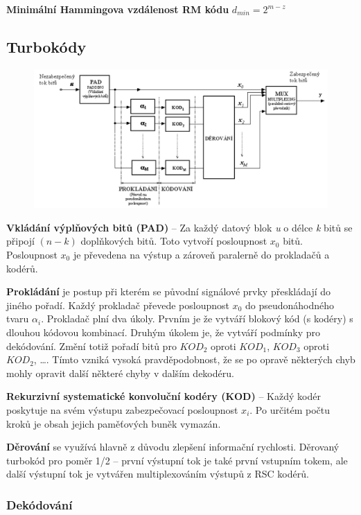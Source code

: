 \textbf{Minimální Hammingova vzdálenost RM kódu} $d_{min} = 2^{m-z}$


\subsection{Turbokódy}

\begin{figure}[h]
    \centering
    \includegraphics[width=\textwidth]{images/043.png}
\end{figure}

\textbf{Vkládání výplňových bitů (PAD)} -- Za každý datový blok \textit{u} o délce \textit{k} bitů se připojí $(n - k)$ doplňkových bitů.
Toto vytvoří posloupnost $x_0$ bitů.
Posloupnost $x_0$ je převedena na výstup a zároveň paralerně do prokladačů a kodérů.

\textbf{Prokládání} je postup při kterém se původní signálové prvky přeskládají do jiného pořadí.
Každý prokladač převede posloupnost $x_0$ do pseudonáhodného tvaru $\alpha_i$.
Prokladač plní dva úkoly.
Prvním je že vytváří blokový kód (s kodéry) s dlouhou kódovou kombinací.
Druhým úkolem je, že vytváří podmínky pro dekódování.
Změní totiž pořadí bitů pro $KOD_2$ oproti $KOD_1$, $KOD_3$ oproti $KOD_2$, \dots.
Tímto vzniká vysoká pravděpodobnost, že se po opravě některých chyb mohly opravit další některé chyby v dalším dekodéru.

\textbf{Rekurzivní systematické konvoluční kodéry (KOD)} -- Každý kodér poskytuje na svém výstupu zabezpečovací posloupnost $x_i$.
Po určitém počtu kroků je obsah jejich paměťových buněk vymazán.

\textbf{Děrování} se využívá hlavně z důvodu zlepšení informační rychlosti. Děrovaný turbokód pro poměr 1/2 -- první výstupní tok je také první vstupním tokem, ale další výstupní tok je vytvářen multiplexováním výstupů z RSC kodérů.

\subsubsection{Dekódování}

